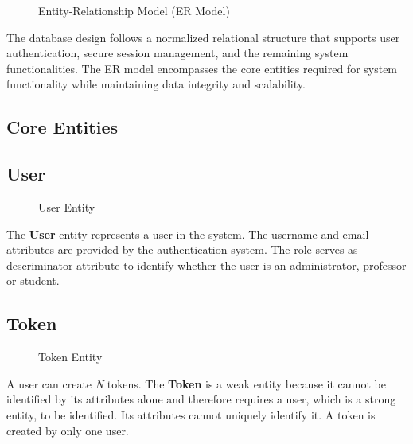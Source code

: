 \begin{figure}[H]
    \begin{center}
        \resizebox{17cm}{!}{}
    \end{center}
    \caption{Entity-Relationship Model (ER Model)}
    \label{fig:er_model}
\end{figure}

The database design follows a normalized relational structure that supports user authentication, secure session management, and the remaining system functionalities. The ER model encompasses the core entities required for system functionality while maintaining data integrity and scalability.

\subsection*{Core Entities}
\subsection*{User}

\begin{figure}[H]
    \begin{center}
        \resizebox{10cm}{!}{}
    \end{center}
    \caption{User Entity}
    \label{fig:user_entity}
\end{figure}

The \textbf{User} entity represents a user in the system. The username and email attributes are provided by the authentication system. The role serves as descriminator attribute to identify whether the user is an administrator, professor or student.

\subsection*{Token}

\begin{figure}[H]
    \begin{center}
        \resizebox{10cm}{!}{}
    \end{center}
    \caption{Token Entity}
    \label{fig:token_entity}
\end{figure}

A user can create \textit{N} tokens. The \textbf{Token} is a weak entity because it cannot be identified by its attributes alone and therefore requires a user, which is a strong entity, to be identified. Its attributes cannot uniquely identify it. A token is created by only one user.


